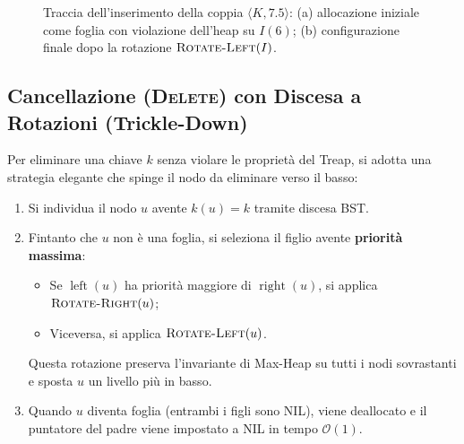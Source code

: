 \begin{figure}[htbp]
{%
}
\caption{Traccia dell'inserimento della coppia $\langle K, 7.5 \rangle$: (a) allocazione iniziale come foglia con violazione dell'heap su $I(6)$; (b) configurazione finale dopo la rotazione $\textsc{Rotate-Left}(I)$.}
\label{fig:treap-insert-trace}
\end{figure}

\FloatBarrier
\subsection{Cancellazione (\textsc{Delete}) con Discesa a Rotazioni (Trickle-Down)}
Per eliminare una chiave $k$ senza violare le propriet\`a del Treap, si adotta una strategia elegante che spinge il nodo da eliminare verso il basso:
\begin{enumerate}
    \item Si individua il nodo $u$ avente $k(u) = k$ tramite discesa BST.
    \item Fintanto che $u$ non \`e una foglia, si seleziona il figlio avente \textbf{priorit\`a massima}:
    \begin{itemize}
        \item Se $\operatorname{left}(u)$ ha priorit\`a maggiore di $\operatorname{right}(u)$, si applica $\textsc{Rotate-Right}(u)$;
        \item Viceversa, si applica $\textsc{Rotate-Left}(u)$.
    \end{itemize}
    Questa rotazione preserva l'invariante di Max-Heap su tutti i nodi sovrastanti e sposta $u$ un livello pi\`u in basso.
    \item Quando $u$ diventa foglia (entrambi i figli sono NIL), viene deallocato e il puntatore del padre viene impostato a NIL in tempo $\mathcal{O}(1)$.
\end{enumerate}

